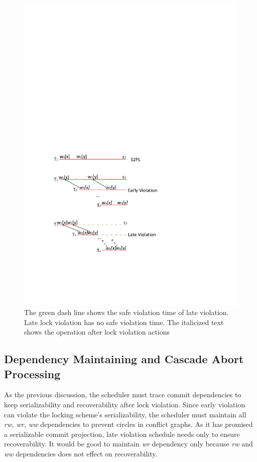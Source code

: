 \documentclass[conference]{IEEEtran}
\begin{document}
\begin{figure}[tbp]
  \centerline{\includegraphics[scale=0.7]{figure/lock_violation_safe.pdf}}
  \caption
  {The green dash line shows the safe violation time of late violation.
  Late lock violation has no safe violation time. 
  The italicized text shows the operation after lock violation actions}
\label{fig:lock_violation_safe}
\end{figure}

\subsection{Dependency Maintaining and Cascade Abort Processing}
As the previous discussion,
the scheduler must trace commit dependencies to keep serializability and recoverability after lock violation.
Since early violation can violate the locking scheme's serializability, the scheduler must maintain all \emph{rw, wr, ww} dependencies to prevent circles in conflict graphs.
As it has promised a serializable commit projection,
late violation schedule needs only to ensure recoverability.
It would be good to maintain \emph{wr} dependency only because
\emph{rw} and \emph{ww} dependencies does not effect on recoverability.
\end{document}
